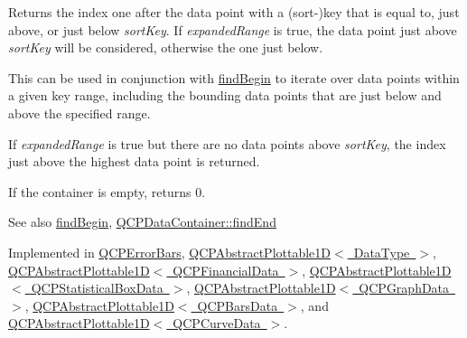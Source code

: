 Returns the index one after the data point with a (sort-\/)key that is equal to, just above, or just below {\itshape sort\+Key}. If {\itshape expanded\+Range} is true, the data point just above {\itshape sort\+Key} will be considered, otherwise the one just below.

This can be used in conjunction with \mbox{\hyperlink{class_q_c_p_plottable_interface1_d_a5b95783271306a4de97be54eac1e7d13}{find\+Begin}} to iterate over data points within a given key range, including the bounding data points that are just below and above the specified range.

If {\itshape expanded\+Range} is true but there are no data points above {\itshape sort\+Key}, the index just above the highest data point is returned.

If the container is empty, returns 0.

\begin{DoxySeeAlso}{See also}
\mbox{\hyperlink{class_q_c_p_plottable_interface1_d_a5b95783271306a4de97be54eac1e7d13}{find\+Begin}}, \mbox{\hyperlink{class_q_c_p_data_container_afb8b8f23cc2b7234a793a25ce79fe48f}{Q\+C\+P\+Data\+Container\+::find\+End}} 
\end{DoxySeeAlso}


Implemented in \mbox{\hyperlink{class_q_c_p_error_bars_a64629f13bb290d41dd8f1b37346bfdd4}{Q\+C\+P\+Error\+Bars}}, \mbox{\hyperlink{class_q_c_p_abstract_plottable1_d_ad913df7f02add35150779dce3913aeae}{Q\+C\+P\+Abstract\+Plottable1\+D$<$ Data\+Type $>$}}, \mbox{\hyperlink{class_q_c_p_abstract_plottable1_d_ad913df7f02add35150779dce3913aeae}{Q\+C\+P\+Abstract\+Plottable1\+D$<$ Q\+C\+P\+Financial\+Data $>$}}, \mbox{\hyperlink{class_q_c_p_abstract_plottable1_d_ad913df7f02add35150779dce3913aeae}{Q\+C\+P\+Abstract\+Plottable1\+D$<$ Q\+C\+P\+Statistical\+Box\+Data $>$}}, \mbox{\hyperlink{class_q_c_p_abstract_plottable1_d_ad913df7f02add35150779dce3913aeae}{Q\+C\+P\+Abstract\+Plottable1\+D$<$ Q\+C\+P\+Graph\+Data $>$}}, \mbox{\hyperlink{class_q_c_p_abstract_plottable1_d_ad913df7f02add35150779dce3913aeae}{Q\+C\+P\+Abstract\+Plottable1\+D$<$ Q\+C\+P\+Bars\+Data $>$}}, and \mbox{\hyperlink{class_q_c_p_abstract_plottable1_d_ad913df7f02add35150779dce3913aeae}{Q\+C\+P\+Abstract\+Plottable1\+D$<$ Q\+C\+P\+Curve\+Data $>$}}.

\mbox{\label{class_q_c_p_plottable_interface1_d_a67093e4ccf490ff5f7750640941ff34c}} 
